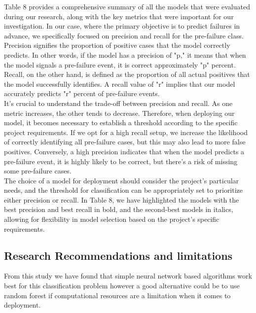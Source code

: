 \documentclass{article}
\begin{document}
Table 8 provides a comprehensive summary of all the models that were evaluated during our research, along with the key metrics that were important for our investigation. In our case, where the primary objective is to predict failures in advance, we specifically focused on precision and recall for the pre-failure class.\\

Precision signifies the proportion of positive cases that the model correctly predicts. In other words, if the model has a precision of "p," it means that when the model signals a pre-failure event, it is correct approximately "p" percent.\\

Recall, on the other hand, is defined as the proportion of all actual positives that the model successfully identifies. A recall value of "r" implies that our model accurately predicts "r" percent of pre-failure events.\\

It's crucial to understand the trade-off between precision and recall. As one metric increases, the other tends to decrease. Therefore, when deploying our model, it becomes necessary to establish a threshold according to the specific project requirements. If we opt for a high recall setup, we increase the likelihood of correctly identifying all pre-failure cases, but this may also lead to more false positives. Conversely, a high precision indicates that when the model predicts a pre-failure event, it is highly likely to be correct, but there's a risk of missing some pre-failure cases.\\

The choice of a model for deployment should consider the project's particular needs, and the threshold for classification can be appropriately set to prioritize either precision or recall. In Table 8, we have highlighted the models with the best precision and best recall in bold, and the second-best models in italics, allowing for flexibility in model selection based on the project's specific requirements. \\

\subsection{Research Recommendations and limitations}

From this study we have found that simple neural network based algorithms work best for this classification problem however a good alternative could be to use random forest if computational resources are a limitation when it comes to deployment. \\
\end{document}
